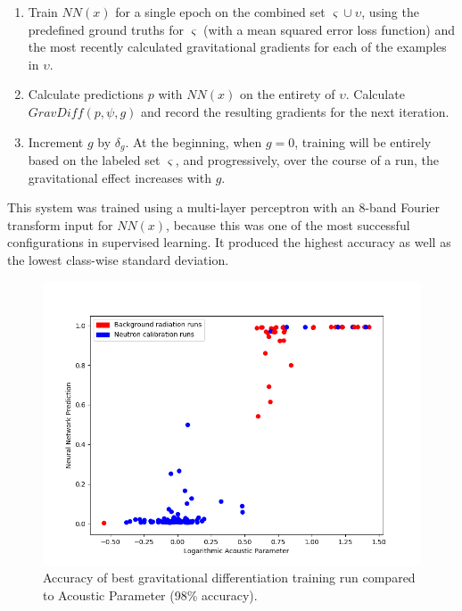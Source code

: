\documentclass[10pt]{article}
\begin{document}
\begin{enumerate}
    \item Train $NN(x)$ for a single epoch on the combined set $\varsigma \cup \upsilon$, using the predefined ground truths for $\varsigma$ (with a mean squared error loss function) and the most recently calculated gravitational gradients for each of the examples in $\upsilon$.
    \item Calculate predictions $p$ with $NN(x)$ on the entirety of $\upsilon$. Calculate $GravDiff(p, \psi, g)$ and record the resulting gradients for the next iteration.
    \item Increment $g$ by $\delta_{g}$. At the beginning, when $g = 0$, training will be entirely based on the labeled set $\varsigma$, and progressively, over the course of a run, the gravitational effect increases with $g$.
\end{enumerate}

This system was trained using a multi-layer perceptron with an 8-band Fourier transform input for $NN(x)$, because this was one of the most successful configurations in supervised learning. It produced the highest accuracy as well as the lowest class-wise standard deviation.

\begin{figure}[H]
    \centering
    \includegraphics[width=\textwidth]{grav_opt_validation}
    \caption{\label{grav_opt_validation} Accuracy of best gravitational differentiation training run compared to Acoustic Parameter (98\% accuracy).}
\end{figure}
\end{document}
